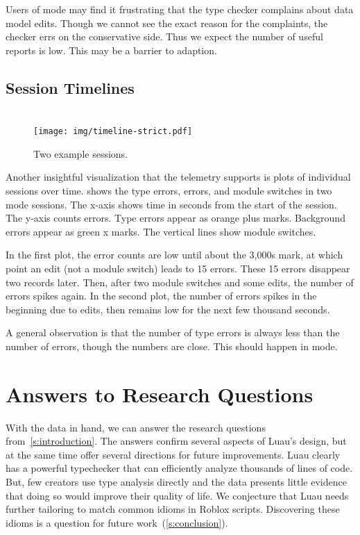 \documentclass[english,submission,cleveref]{programming}
\begin{document}
Users of \mstrict{} mode may find it frustrating that the type checker complains
about data model edits.
Though we cannot see the exact reason for the complaints, the checker errs on
the conservative side.
Thus we expect the number of useful reports is low.
This may be a barrier to adaption.


\subsection{Session Timelines}

\begin{figure}[t]\centering

  \medskip{}
  \mstrict{}\\
  \texttt{[image: img/timeline-strict.pdf]}

  \caption{Two example sessions.}
  \label{f:indy-session}
\end{figure}

Another insightful visualization that the telemetry supports is plots of individual sessions
over time.
 shows the type errors, \FS{} errors, and module switches
in two \mstrict{} mode sessions.
The x-axis shows time in seconds from the start of the session.
The y-axis counts errors.
Type errors appear as orange plus marks.
Background errors appear as green x marks.
The vertical lines show module switches.

In the first plot, the error counts are low until about the 3,000s mark,
at which point an edit (not a module switch) leads to 15 errors.
These 15 errors disappear two records later.
Then, after two module switches and some edits, the number of errors spikes again.
In the second plot, the number of errors spikes in the beginning due to edits,
then remains low for the next few thousand seconds.

A general observation is that the number of type errors is always less than the number of \FS{}
errors, though the numbers are close.
This should happen in \mstrict{} mode.


\section{Answers to Research Questions}
\label{s:discussion}

With the data in hand, we can answer the research questions
from~\cref{s:introduction}.
The answers confirm several aspects of Luau's design, but
at the same time offer several directions for future improvements.
Luau clearly has a powerful typechecker that can efficiently
analyze thousands of lines of code.
But, few creators use type analysis directly and the data presents little
evidence that doing so would improve their quality of life.
We conjecture that Luau needs further tailoring to match
common idioms in Roblox scripts.
Discovering these idioms is a question for future work~(\cref{s:conclusion}).
\end{document}
